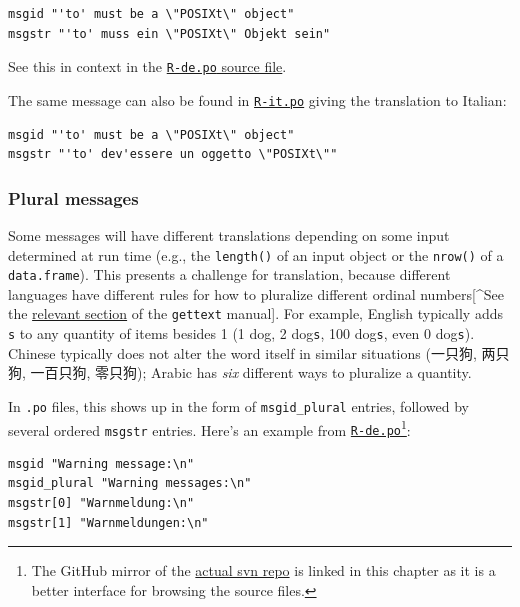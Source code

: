 \documentclass[
]{book}
\begin{document}
\begin{verbatim}
msgid "'to' must be a \"POSIXt\" object"
msgstr "'to' muss ein \"POSIXt\" Objekt sein"
\end{verbatim}

See this in context in the \href{https://svn.r-project.org/R/trunk/src/library/base/po/R-de.po}{\texttt{R-de.po} source
file}.

The same message can also be found in
\href{https://svn.r-project.org/R/trunk/src/library/base/po/R-it.po}{\texttt{R-it.po}}
giving the translation to Italian:

\begin{verbatim}
msgid "'to' must be a \"POSIXt\" object"
msgstr "'to' dev'essere un oggetto \"POSIXt\""
\end{verbatim}

\subsubsection{Plural messages}\label{plural-messages}

Some messages will have different translations depending on some input
determined at run time (e.g., the \texttt{length()} of an input object or the
\texttt{nrow()} of a \texttt{data.frame}). This presents a challenge for translation,
because different languages have different rules for how to pluralize
different ordinal numbers{[}\^{}See the \href{https://www.gnu.org/software/gettext/manual/html_node/Plural-forms.html}{relevant
section}
of the \texttt{gettext} manual{]}. For example, English typically adds \texttt{s} to any
quantity of items besides 1 (1 dog, 2 dog\texttt{s}, 100 dog\texttt{s}, even 0
dog\texttt{s}). Chinese typically does not alter the word itself in similar
situations (一只狗, 两只狗, 一百只狗, 零只狗); Arabic has \emph{six}
different ways to pluralize a quantity.

In \texttt{.po} files, this shows up in the form of \texttt{msgid\_plural} entries,
followed by several ordered \texttt{msgstr} entries. Here's an example from
\href{https://github.com/r-devel/r-svn/blob/c715d61cb74b3fee2d035faed9b258e86e420b75/src/library/base/po/R-de.po\#L2015-L2018}{\texttt{R-de.po}}\footnote{The GitHub mirror of the \href{https://svn.r-project.org/R/trunk/}{actual svn
  repo} is linked in this chapter
  as it is a better interface for browsing the source files.}:

\begin{verbatim}
msgid "Warning message:\n"
msgid_plural "Warning messages:\n"
msgstr[0] "Warnmeldung:\n"
msgstr[1] "Warnmeldungen:\n"
\end{verbatim}
\end{document}
